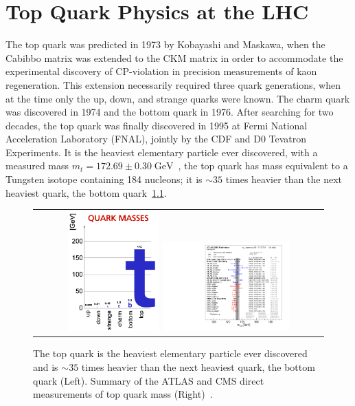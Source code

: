 
\chapter{Top Quark Physics at the LHC}
The top quark was predicted in 1973 by Kobayashi and Maskawa, when the Cabibbo matrix was extended to the CKM matrix in order to accommodate the experimental discovery of CP-violation in precision measurements of kaon regeneration.
This extension necessarily required three quark generations, when at the time only the up, down, and strange quarks were known.
The charm quark was discovered in 1974 and the bottom quark in 1976.
After searching for two decades, the top quark was finally discovered in 1995 at Fermi National Acceleration Laboratory (FNAL), jointly by the CDF and D0 Tevatron Experiments.
It is the heaviest elementary particle ever discovered, with a measured mass $m_t = 172.69 \pm 0.30 \; \si{\GeV}$~\cite{bib:PDG}, the top quark has mass equivalent to a Tungsten isotope containing 184 nucleons; it is $\sim 35$ times heavier than the next heaviest quark, the bottom quark~\ref{QuarkMasses}.
\begin{figure}[!h]
  \begin{center}
    \begin{tabular}{c}
        \includegraphics[width=0.325\textwidth]{fig_TopQuark/TopQuarkMass.png}
        \includegraphics[width=0.45\textwidth]{fig_TopQuark/LHC_topmass_oct22.pdf}
    \end{tabular}
    \caption{The top quark is the heaviest elementary particle ever discovered and is $\sim 35$ times heavier than the next heaviest quark, the bottom quark (Left).
            Summary of the ATLAS and CMS direct measurements of top quark mass (Right)~\cite{LHCTopWGSummaryPlots}.
            }
    \label{QuarkMasses}
  \end{center}
\end{figure}
